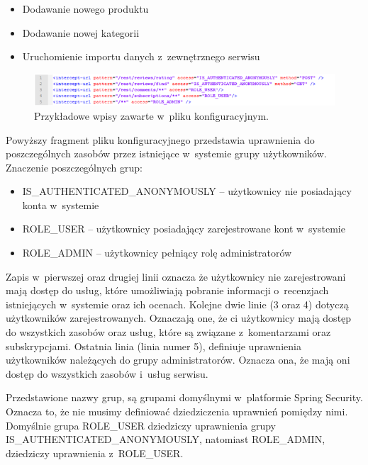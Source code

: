 \begin{itemize}
\item Dodawanie nowego produktu
\item Dodawanie nowej kategorii
\item Uruchomienie importu danych z~zewnętrznego serwisu
\end{itemize}

\begin{figure}[h]
	\centering
	\includegraphics[width=1.00\textwidth]{images/model_uprawnien_xml.png}
	\caption{Przykładowe wpisy zawarte w~pliku konfiguracyjnym.}
\end{figure}

Powyższy fragment pliku konfiguracyjnego przedstawia uprawnienia do poszczególnych zasobów przez istniejące w~systemie grupy użytkowników. Znaczenie poszczególnych grup:

\begin{itemize}
\item IS\_AUTHENTICATED\_ANONYMOUSLY – użytkownicy nie posiadający konta w~systemie
\item ROLE\_USER – użytkownicy posiadający zarejestrowane kont w~systemie
\item ROLE\_ADMIN – użytkownicy pełniący rolę administratorów
\end{itemize}

 Zapis w~pierwszej oraz drugiej linii oznacza że użytkownicy nie zarejestrowani mają dostęp do usług, które umożliwiają pobranie informacji o~recenzjach istniejących w~systemie oraz ich ocenach.
Kolejne dwie linie (3 oraz 4) dotyczą użytkowników zarejestrowanych. Oznaczają one, że ci użytkownicy mają dostęp do wszystkich zasobów oraz usług, które są związane z~komentarzami oraz subskrypcjami.
Ostatnia linia (linia numer 5), definiuje uprawnienia użytkowników należących do grupy administratorów. Oznacza ona, że mają oni dostęp do wszystkich zasobów i~usług serwisu.

Przedstawione nazwy grup, są grupami domyślnymi w~platformie Spring Security. Oznacza to, że nie musimy definiować dziedziczenia uprawnień pomiędzy nimi. Domyślnie grupa ROLE\_USER dziedziczy uprawnienia grupy \newline IS\_AUTHENTICATED\_ANONYMOUSLY, natomiast ROLE\_ADMIN, dziedziczy uprawnienia z~ROLE\_USER.\cite{springSecurity}

